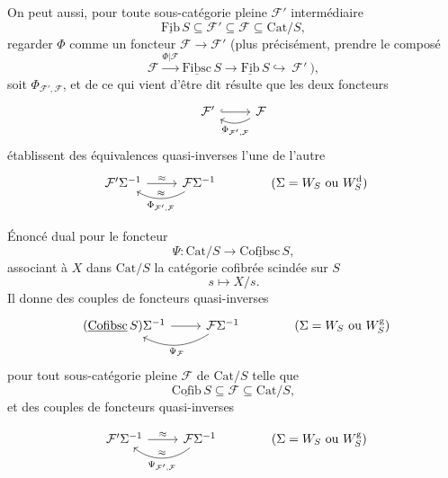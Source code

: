 \documentclass[11pt]{article}
\newcommand{\printedpage}[1]{\marginpar{\footnotesize p.~#1}}
\newcommand{\msp}[1]{\marginpar{\footnotesize [#1]}}
\newcommand{\Cat}{\mathrm{Cat}}
\newcommand{\ul}[1]{\underline{\mathrm{#1}}}
\begin{document}
On peut aussi, pour toute sous-catégorie pleine $\mathcal{F}'$ intermédiaire
\[ \ul{Fib}\,S\subseteq\mathcal{F}'\subseteq\mathcal{F}\subseteq\Cat/S, \]
regarder $\Phi$ comme un foncteur $\mathcal{F}\longrightarrow\mathcal{F}'$ (plus précisément, prendre le composé
\[ \mathcal{F}\xrightarrow{\Phi|\mathcal{F}}\ul{Fibsc}\,S\longrightarrow\ul{Fib}\,S\hookrightarrow\ \mathcal{F}'\ ), \]
soit $\Phi_{\mathcal{F}',\mathcal{F}}$, et de ce qui vient d'être dit résulte que les deux foncteurs
\[
\begin{tikzcd}
\mathcal{F}' \arrow[r,hook] & \mathcal{F} \arrow[l,bend left,"\Phi_{\mathcal{F}',\mathcal{F}}"]
\end{tikzcd}
\]
\msp{page 77}
établissent des équivalences quasi-inverses l'une de l'autre
\[
\begin{tikzcd}
\mathcal{F}'\Sigma^{-1} \arrow[r,"\approx"] & \mathcal{F}\Sigma^{-1} \arrow[l,bend left,"\approx"',"\Phi_{\mathcal{F}',\mathcal{F}}"]
\end{tikzcd}
\qquad\qquad(\Sigma=W_S\text{ ou }W_S^{\mathrm{d}})
\]

Énoncé dual pour le foncteur
\[ \Psi : \Cat/S\longrightarrow\ul{Cofibsc}\,S, \]
associant à $X$ dans $\Cat/S$ la catégorie cofibrée scindée sur $S$
\[ s\longmapsto X/s. \]
Il donne des couples de foncteurs quasi-inverses
\[
\begin{tikzcd}
(\ul{Cofibsc}\,S)\Sigma^{-1} \arrow[r] & \mathcal{F}\Sigma^{-1} \arrow[l,bend left,"\Psi_{\mathcal{F}}"]
\end{tikzcd}
\qquad\qquad(\Sigma=W_S\text{ ou }W_S^{\mathrm{g}})
\]
pour tout sous-catégorie pleine $\mathcal{F}$ de $\Cat/S$ telle que %
\[ \ul{Cofib}\,S\subseteq\mathcal{F}\subseteq\Cat/S, \]
et des couples de foncteurs quasi-inverses

\printedpage{49}

\[
\begin{tikzcd}
\mathcal{F}'\Sigma^{-1} \arrow[r, "\approx"] & \mathcal{F}\Sigma^{-1} \arrow[l, bend left=40, "\approx"', "\Psi_{\mathcal{F}',\mathcal{F}}"]
\end{tikzcd}
\qquad\qquad (\Sigma = W_S \text{ ou } W_S^{\mathrm{g}})
\]
\end{document}

